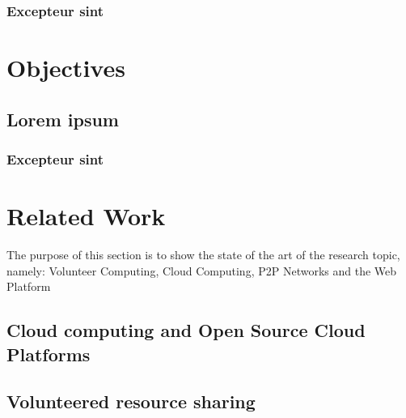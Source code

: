 \documentclass{./llncs2e/llncs}
\begin{document}
\subsubsection{Excepteur sint}




% 
% 

\section{Objectives}

\subsection{Lorem ipsum}

\subsubsection{Excepteur sint}





% 
% 

\section{Related Work}
The purpose of this section is to show the state of the art of the research topic, namely: Volunteer Computing, Cloud Computing, P2P Networks and the Web Platform

% 
% 
\subsection{Cloud computing and Open Source Cloud Platforms}



% 
% 
\subsection{Volunteered resource sharing}
\end{document}

